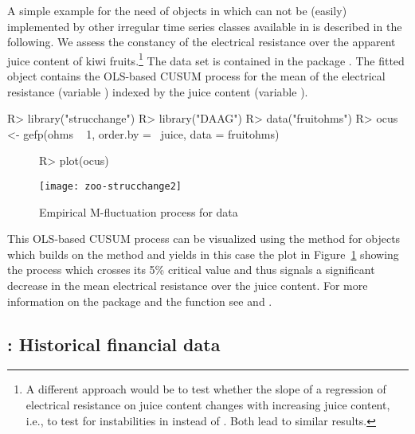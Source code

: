 \documentclass{Z}
\begin{document}
A simple example for the need of  objects in 
which can not be (easily) implemented by other irregular time series classes
available in  is described in the following. We assess the constancy of the
electrical resistance over the apparent juice content of kiwi fruits.\footnote{A different
approach would be to test whether the slope of a regression of electrical resistance
on juice content changes with increasing juice content, i.e., to test for
instabilities in  instead of . Both lead to 
similar results.} The data
set  is contained in the  package \citep{zoo:DAAG:2004}.
The fitted  object contains the OLS-based CUSUM process for the mean
of the electrical resistance (variable ) indexed by the juice
content (variable ).

\begin{Schunk}
\begin{Sinput}
R> library("strucchange")
R> library("DAAG")
R> data("fruitohms")
R> ocus <- gefp(ohms ~ 1, order.by = ~juice, data = fruitohms)
\end{Sinput}
\end{Schunk}

\begin{figure}[h!]
\begin{center}
\begin{Schunk}
\begin{Sinput}
R> plot(ocus)
\end{Sinput}
\end{Schunk}
\texttt{[image: zoo-strucchange2]}
\caption{\label{fig:strucchange} Empirical M-fluctuation process for  data}
\end{center}
\end{figure}

This OLS-based CUSUM process can be visualized using the  method
for  objects which builds on the  method and yields in
this case the plot in Figure~\ref{fig:strucchange} showing the process which
crosses its 5\% critical value and 
thus signals a significant decrease in the mean electrical resistance over the
juice content. For more information on the package  and the 
function  see \cite{zoo:Zeileis+Leisch+Hornik:2002} and 
\cite{zoo:Zeileis:2004}.


\subsection[tseries: Historical financial data]{: Historical financial data}
\label{sec:tseries}
\end{document}
